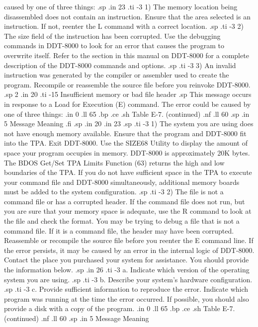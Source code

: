 caused by one of three things:
.sp 
.in 23
.ti -3
1) The memory location being disassembled does not contain an 
instruction.  Ensure that the area selected is an instruction.  If not, 
reenter the L
command with a correct location.
.sp
.ti -3
2) The size field of the instruction has been corrupted.  Use the debugging 
commands in DDT-8000 to look for an error that causes the
program to overwrite itself.  Refer to the section in this manual 
on DDT-8000 for a complete description of the DDT-8000 commands and 
options.
.sp
.ti -3
3) An invalid instruction was generated by the compiler or assembler used to
create the program.  Recompile or reassemble the source file before you 
reinvoke DDT-8000.
.sp 2
.in 20
.ti -15
Insufficient memory or bad file header
.sp
This message occurs in response to a Load for Execution (E) command.  The error
could be caused by one of three things:
.in 0
.ll 65
.bp
.ce
.sh
Table E-7.  (continued)
.nf
.ll 60
.sp
.in 5
Message        Meaning
.fi
.sp
.in 20
.in 23
.sp
.ti -3
1) The system you are using does not have enough memory available.  Ensure 
that the program and DDT-8000 fit into the TPA. 
Exit DDT-8000.  Use the SIZE68 Utility to display the 
amount of space your program occupies in memory.  DDT-8000 is 
approximately 20K bytes.  The BDOS Get/Set TPA 
Limits Function (63) returns the 
high and low boundaries of the TPA.  If you do not have sufficient 
space in the TPA to execute your 
command file and DDT-8000 simultaneously, additional memory boards 
must be added to the system configuration.
.sp
.ti -3
2) The file is not a command file or has a corrupted header.  If the command 
file does not run, but
you are sure that your memory space is adequate, use the R command to look at
the file and check the format.  You may be trying to debug a file that is not
a command file.  If it is a command file, the header may have been corrupted.  
Reassemble or recompile the source file before you reenter the E command line.
If the error persists, it may be caused by an error in the internal 
logic of DDT-8000.  Contact the place you purchased your system for 
assistance.  
You should provide the information below.
.sp
.in 26
.ti -3
a. Indicate which version of the operating system you are using.
.sp
.ti -3
b. Describe your system's hardware configuration.
.sp
.ti -3
c. Provide sufficient information to reproduce the error.  Indicate 
which program was running at the time the error occurred.  If possible, 
you should also provide a disk with a copy of the program.
.in 0
.ll 65
.bp
.ce
.sh
Table E-7.  (continued)
.nf
.ll 60
.sp
.in 5
Message        Meaning
